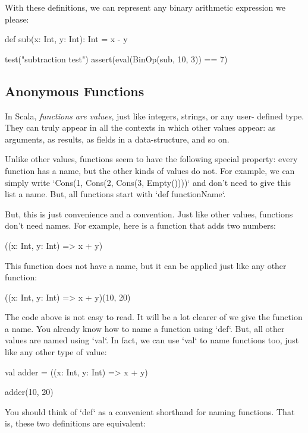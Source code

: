 \documentclass{book}
\begin{document}
With these definitions, we can represent any binary arithmetic expression
we please:

\begin{scalacode}
def sub(x: Int, y: Int): Int = x - y

test("subtraction test") {
  assert(eval(BinOp(sub, 10, 3)) == 7)
}
\end{scalacode}

\subsection{Anonymous Functions}

In Scala, \emph{functions are values}, just like integers, strings, or any user-
defined type. They can truly appear in all the contexts in which other values
appear: as arguments, as results, as fields in a data-structure, and so on.

Unlike other values, functions seem to have the following special property:
every function has a name, but the other kinds of values do not.
For example, we can simply write `Cons(1, Cons(2, Cons(3, Empty())))`
and don't need to give this list a name. But, all functions
start with `def functionName`.

But, this is just convenience and a convention. Just like other values,
functions don't need names. For example, here is a function that adds two
numbers:

\begin{scalacode}
((x: Int, y: Int) => x + y)
\end{scalacode}

This function does not have a name, but it can be applied just like
any other function:

\begin{scalacode}
((x: Int, y: Int) => x + y)(10, 20)
\end{scalacode}

The code above is not easy to read. It will be a lot clearer of we give the
function a name. You already know how to name a function using `def`. But, all
other values are named using `val`. In fact, we can use `val` to name functions
too, just like any other type of value:

\begin{scalacode}
val adder = ((x: Int, y: Int) => x + y)

adder(10, 20)
\end{scalacode}

You should think of `def` as a convenient shorthand for naming functions.
That is, these two definitions are equivalent:
\end{document}
